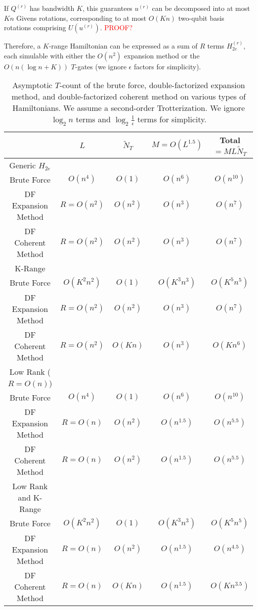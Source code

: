If $Q^{(r)}$ has bandwidth $K$, this guarantees $u^{(r)}$ can be decomposed into at most $Kn$ Givens rotations, corresponding to at most $O(Kn)$ two-qubit basis rotations comprising $U(u^{(r)})$. \textcolor{red}{PROOF?}

Therefore, a $K$-range Hamiltonian can be expressed as a sum of $R$ terms $H_{2e}^{(r)}$, each simulable with either the $O(n^2)$ expansion method or the $O(n(\log{n} + K))$ $T$-gates (we ignore $\epsilon$ factors for simplicity).

\begin{table}[h!]
    \centering
    \renewcommand{\arraystretch}{1.25}
    \begin{tabular}{||c c c c c||} 
        \hline
         & $L$ & $\tilde{N}_T$ & $M = O(L^{1.5})$ & Total $= ML\tilde{N}_T$ \\
        \hline\hline
        Generic $H_{2e}$ & & & & \\
        \hline
        Brute Force & $O(n^4)$ & $O(1)$ & $O(n^6)$ & $O(n^{10})$ \\ 
        DF Expansion Method & $R = O(n^2)$ & $O(n^2)$ & $O(n^3)$ & $O(n^7)$ \\
        DF Coherent Method & $R = O(n^2)$ & $O(n^2)$ & $O(n^3)$ & $O(n^7)$ \\
        \hline\hline
        K-Range & & & & \\
        \hline
        Brute Force & $O(K^2n^2)$ & $O(1)$ & $O(K^3n^3)$ & $O(K^5n^5)$ \\ 
        DF Expansion Method & $R = O(n^2)$ & $O(n^2)$ & $O(n^3)$ & $O(n^7)$ \\
        DF Coherent Method & $R = O(n^2)$ & $O(Kn)$ & $O(n^3)$ & $O(Kn^6)$ \\
        \hline\hline
        Low Rank ($R = O(n)$) & & & & \\
        \hline
        Brute Force & $O(n^4)$ & $O(1)$ & $O(n^6)$ & $O(n^{10})$ \\ 
        DF Expansion Method & $R = O(n)$ & $O(n^2)$ & $O(n^{1.5})$ & $O(n^{5.5})$ \\
        DF Coherent Method & $R = O(n)$ & $O(n^2)$ & $O(n^{1.5})$ & $O(n^{5.5})$ \\
        \hline\hline
        Low Rank and K-Range & & & & \\
        \hline
        Brute Force & $O(K^2n^2)$ & $O(1)$ & $O(K^3n^3)$ & $O(K^5n^5)$ \\ 
        DF Expansion Method & $R = O(n)$ & $O(n^2)$ & $O(n^{1.5})$ & $O(n^{4.5})$ \\
        DF Coherent Method & $R = O(n)$ & $O(Kn)$ & $O(n^{1.5})$ & $O(Kn^{3.5})$ \\
        \hline
    \end{tabular}
    \caption{Asymptotic $T$-count of the brute force, double-factorized expansion method, and double-factorized coherent method on various types of Hamiltonians. We assume a second-order Trotterization. We ignore $\log_2{n}$ terms and $\log_2{\frac{1}{\epsilon}}$ terms for simplicity.}
    \label{table:1}
\end{table}

